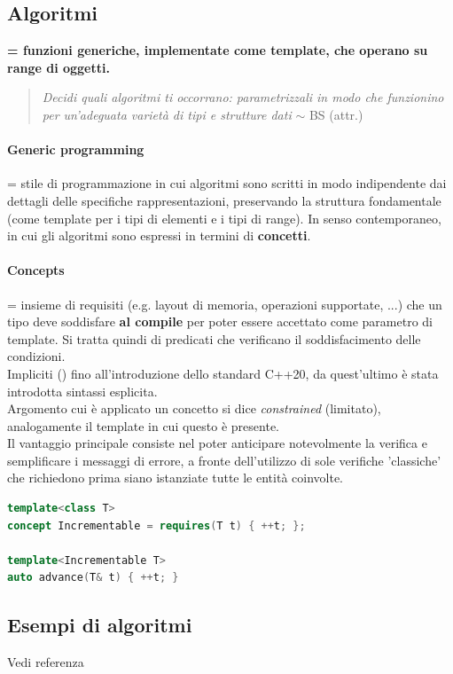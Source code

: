\documentclass[10pt, oneside]{book}
\begin{document}
\subsection{Algoritmi}
\textbf{= funzioni generiche, implementate come template, che operano su range di oggetti.
}
\begin{quote}
\textit{Decidi quali algoritmi ti occorrano:
parametrizzali in modo che funzionino
per un'adeguata varietà di tipi e strutture dati} $\sim$ BS (attr.)
\end{quote}

\paragraph{Generic programming} = stile di programmazione in cui algoritmi sono scritti in modo indipendente dai dettagli delle specifiche rappresentazioni, preservando la struttura fondamentale (come template per i tipi di elementi e i tipi di range). In senso contemporaneo, in cui gli algoritmi sono espressi in termini di \textbf{concetti}.

\paragraph{Concepts} = insieme di requisiti (e.g. layout di memoria, operazioni supportate, ...) che un tipo deve soddisfare \textbf{al compile} per poter essere accettato come parametro di template. Si tratta quindi di predicati che verificano il soddisfacimento delle condizioni.\\
Impliciti () fino all'introduzione dello standard C++20, da quest'ultimo è stata introdotta sintassi esplicita.\\
Argomento cui è applicato un concetto si dice \textit{constrained} (limitato), analogamente il template in cui questo è presente.\\
Il vantaggio principale consiste nel poter anticipare notevolmente la verifica e semplificare i messaggi di errore, a fronte dell'utilizzo di sole verifiche 'classiche' che richiedono prima siano istanziate tutte le entità coinvolte.
\begin{lstlisting}[language=C++]
template<class T>
concept Incrementable = requires(T t) { ++t; };

template<Incrementable T>
auto advance(T& t) { ++t; }
\end{lstlisting}

\subsection{Esempi di algoritmi}
Vedi referenza
\end{document}
